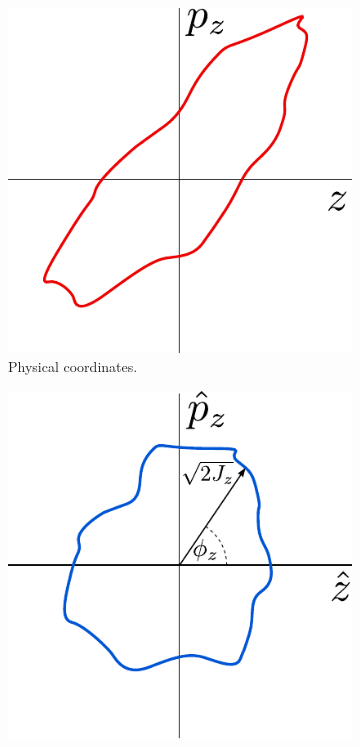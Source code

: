 \begin{figure}[!hbt]
    \begin{center}
    \begin{subfigure}[b]{0.30\textwidth}
        \begin{center}
        \includegraphics[width=\textwidth]{Figures/Beam_Dynamics_Theory/phase_space_nonlinear_physical.pdf}
        \caption{Physical coordinates.}
        \label{fig:phase_space_physical_non-linear}
        \end{center}
    \end{subfigure}
    \hfill
    \begin{subfigure}[b]{0.30\textwidth}
        \begin{center}
        \includegraphics[width=\textwidth]{Figures/Beam_Dynamics_Theory/phase_space_nonlinear_normalized.pdf}

\end{center}
\end{subfigure}
\end{center}
\end{figure}
